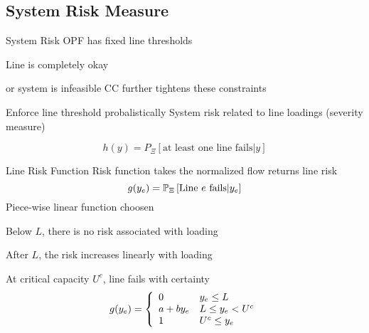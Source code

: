\subsection{System Risk Measure}
\begin{frame}{System Risk}
OPF has fixed line thresholds
\bi
\item Line is completely okay
\item or system is infeasible
\ei
\pause
CC further tightens these constraints
\bi
\item Enforce line threshold probalistically
\ei
\pause
System risk related to line loadings (severity measure) \footnotemark
\pause

\vspace{10pt}

\begin{equation*}
 h(y) = P_\Xi \left[ \mbox{at least one line fails} | y \right] 
\end{equation*}
\EBR


\end{frame}



\begin{frame}{Line Risk Function}
Risk function takes the normalized flow returns line risk 
\begin{equation*}
 g(y_e) = \mathbb{P}_{\Xi} \left[ \text{Line }e\text{ fails} | y_e \right] 
\end{equation*}
\pause
Piece-wise linear function choosen
\bi
\item Below $L$, there is no risk associated with loading
\item After $L$, the risk increases linearly with loading
\item At critical capacity $U^c$, line fails with certainty
\ei
\pause
\begin{equation*}
g(y_e) = \left\{ \begin{array}{l l}
  0 & y_e \leq L \\
  a + b y_e & L \leq y_e < U^c \\
  1 & U^c \leq y_e 
\end{array}
\right.
\end{equation*}
\end{frame}



